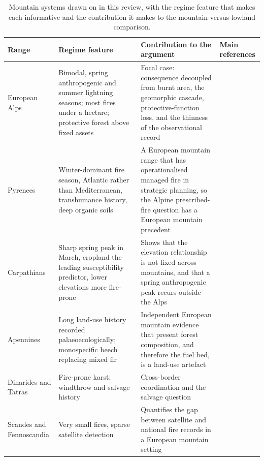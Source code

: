 \documentclass[11pt,a4paper]{article}
\begin{document}
\begin{table}[H]
\centering
\footnotesize
\setlength{\tabcolsep}{4pt}
\renewcommand{\arraystretch}{1.1}
\caption{Mountain systems drawn on in this review, with the regime feature that makes each informative and the contribution it makes to the mountain-versus-lowland comparison.}
\label{tab:ranges}
\begin{tabularx}{\textwidth}{@{}>{\raggedright\arraybackslash}p{2.0cm} >{\raggedright\arraybackslash}p{3.3cm} >{\raggedright\arraybackslash}X >{\raggedright\arraybackslash}p{3.1cm}@{}}
\toprule
\textbf{Range} & \textbf{Regime feature} & \textbf{Contribution to the argument} & \textbf{Main references} \\
\midrule
European Alps & Bimodal, spring anthropogenic and summer lightning seasons; most fires under a hectare; protective forest above fixed assets & Focal case: consequence decoupled from burnt area, the geomorphic cascade, protective-function loss, and the thinness of the observational record & \citealp{muller_forest_2020, conedera_characterizing_2018, moos_climate_2021, melzner_wildfire-induced_2025} \\
Pyrenees & Winter-dominant fire season, Atlantic rather than Mediterranean, transhumance history, deep organic soils & A European mountain range that has operationalised managed fire in strategic planning, so the Alpine prescribed-fire question has a European mountain precedent & \citealp{oliveres_path_2025} \\
Carpathians & Sharp spring peak in March, cropland the leading susceptibility predictor, lower elevations more fire-prone & Shows that the elevation relationship is not fixed across mountains, and that a spring anthropogenic peak recurs outside the Alps & \citealp{manczinger_fire_2025} \\
Apennines & Long land-use history recorded palaeoecologically; monospecific beech replacing mixed fir & Independent European mountain evidence that present forest composition, and therefore the fuel bed, is a land-use artefact & \citealp{moralesmolino_longterm_2021} \\
Dinarides and Tatras & Fire-prone karst; windthrow and salvage history & Cross-border coordination and the salvage question & \citealp{cagliero_effect_nodate, seben_impact_2024} \\
Scandes and Fennoscandia & Very small fires, sparse satellite detection & Quantifies the gap between satellite and national fire records in a European mountain setting & \citealp{bakke_datadriven_2023} \\

\end{tabularx}
\end{table}
\end{document}

